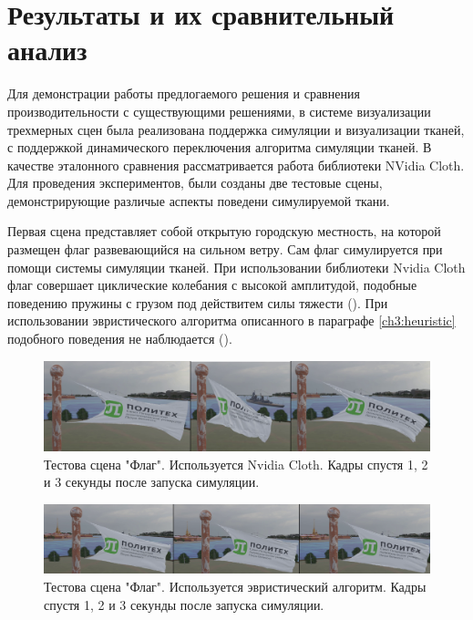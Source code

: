 \chapter{Результаты и их сравнительный анализ} \label{ch4}
	Для демонстрации работы предлогаемого решения и сравнения производительности с существующими решениями, в системе визуализации трехмерных сцен  была реализована поддержка симуляции и визуализации тканей, с поддержкой динамического переключения алгоритма симуляции тканей. В качестве эталонного сравнения рассматривается работа библиотеки NVidia Cloth. Для проведения экспериментов, были созданы две тестовые сцены, демонстрирующие различые аспекты поведени симулируемой ткани. 
	
	Первая сцена представляет собой открытую городскую местность, на которой размещен флаг развевающийся на сильном ветру. Сам флаг симулируется при помощи системы симуляции тканей. При использовании библиотеки Nvidia Cloth флаг совершает циклические колебания с высокой амплитудой, подобные поведению пружины с грузом под действитем силы тяжести (). При использовании эвристического алгоритма описанного в параграфе \ref{ch3:heuristic} подобного поведения не наблюдается ().
	
	\begin{figure}[ht!] 
		\center
		\includegraphics [scale=0.25] {my_folder/images//streching}	
		\caption{Тестова сцена "Флаг". Используется Nvidia Cloth. Кадры спустя 1, 2 и 3 секунды после запуска симуляции.} 
		\label{fig:flagStreching}
	\end{figure}
	
	\begin{figure}[ht!] 
		\center
		\includegraphics [scale=0.2] {my_folder/images//notStreching}	
		\caption{Тестова сцена "Флаг". Используется эвристический алгоритм. Кадры спустя 1, 2 и 3 секунды после запуска симуляции.} 
		\label{fig:flagNotStreching}
	\end{figure}
	
